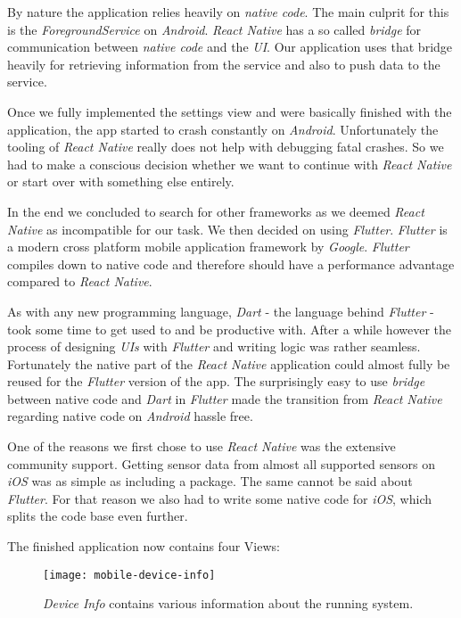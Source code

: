 By nature the application relies heavily on \textit{native code}. The main culprit for this is the
\textit{ForegroundService} on \textit{Android}. \textit{React Native} has a so called
\textit{bridge} for communication between \textit{native code} and the \textit{UI}. Our application
uses that bridge heavily for retrieving information from the service and also to push data to the
service.

Once we fully implemented the settings view and were basically finished with the application, the
app started to crash constantly on \textit{Android}. Unfortunately the tooling of \textit{React
Native} really does not help with debugging fatal crashes. So we had to make a conscious decision
whether we want to continue with \textit{React Native} or start over with something else entirely.

In the end we concluded to search for other frameworks as we deemed \textit{React Native} as
incompatible for our task. We then decided on using \textit{Flutter}. \textit{Flutter} is a modern
cross platform mobile application framework by \textit{Google}. \textit{Flutter} compiles down to
native code and therefore should have a performance advantage compared to \textit{React Native}.

As with any new programming language, \textit{Dart} - the language behind \textit{Flutter} - took
some time to get used to and be productive with. After a while however the process of designing
\textit{UIs} with \textit{Flutter} and writing logic was rather seamless. Fortunately the native
part of the \textit{React Native} application could almost fully be reused for the \textit{Flutter}
version of the app. The surprisingly easy to use \textit{bridge} between native code and
\textit{Dart} in \textit{Flutter} made the transition from \textit{React Native} regarding native
code on \textit{Android} hassle free.

One of the reasons we first chose to use \textit{React Native} was the extensive community support.
Getting sensor data from almost all supported sensors on \textit{iOS} was as simple as including a
package. The same cannot be said about \textit{Flutter}. For that reason we also had to write some
native code for \textit{iOS}, which splits the code base even further.

The finished application now contains four Views:

\begin{figure}[H]
  \centering
  \texttt{[image: mobile-device-info]}
  \caption{\textit{Device Info} contains various information about the running system.}
\end{figure}


